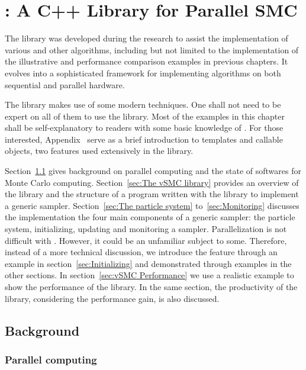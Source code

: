 \chapter[vSMC: A C++ Library for Parallel SMC]
{\protect\vsmc: A C++ Library for Parallel SMC}
\label{cha:vSMC: A C++ Library for Parallel SMC}

The \vsmc library was developed during the research to assist the
implementation of various \smc and other algorithms, including but not limited
to the implementation of the illustrative and performance comparison examples
in previous chapters. It evolves into a sophisticated \cpp framework for
implementing \smc algorithms on both sequential and parallel hardware.

The library makes use of some modern \cpp techniques. One shall not need to be
expert on all of them to use the library. Most of the examples in this chapter
shall be self-explanatory to readers with some basic knowledge of \cpp. For
those interested, Appendix~ serve as a brief
introduction to \cpp templates and callable objects, two features used
extensively in the \vsmc library.

Section~\ref{sec:vSMC Background} gives background on parallel computing and
the state of softwares for Monte Carlo computing. Section~\ref{sec:The vSMC
  library} provides an overview of the library and the structure of a program
written with the library to implement a generic \smc sampler.
Section~\ref{sec:The particle system} to~\ref{sec:Monitoring} discusses the
implementation the four main components of a generic \smc sampler: the
particle system, initializing, updating and monitoring a sampler.
Parallelization is not difficult with \vsmc. However, it could be an
unfamiliar subject to some. Therefore, instead of a more technical discussion,
we introduce the feature through an example in section~\ref{sec:Initializing}
and demonstrated through examples in the other sections. In
section~\ref{sec:vSMC Performance} we use a realistic example to show the
performance of the library. In the same section, the productivity of the
library, considering the performance gain, is also discussed.

\section{Background}
\label{sec:vSMC Background}

\subsection{Parallel computing}
\label{sub:Parallel computing}

